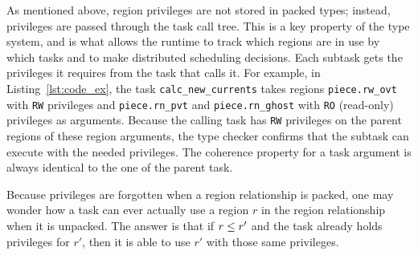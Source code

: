 As mentioned above, region privileges are not stored in packed types;
instead, privileges are passed through the task call tree.  This is a key property of the type
system, and is what allows the runtime to 
track which regions are in use by which tasks and to make distributed scheduling decisions.
Each subtask gets the privileges it requires from
the task that calls it.  For example, in Listing~\ref{lst:code_ex},
the task {\tt calc\_new\_currents} takes regions {\tt piece.rw\_ovt} with {\tt RW} privileges
and {\tt piece.rn\_pvt} and {\tt piece.rn\_ghost} with {\tt RO} (read-only) privileges
as arguments.  Because the calling task has {\tt RW} privileges on the parent regions of these
region arguments, the type checker confirms that the subtask can execute with the needed privileges.
The coherence property for a task argument is always identical to the one of the parent task.

Because privileges are forgotten when a region relationship is packed, one may wonder how
a task can ever actually use a region $r$ in the region relationship when it is unpacked.
The answer is that if $r \leq r'$ and the task already holds privileges for $r'$, then it is able
to use $r'$ with those same privileges.  



